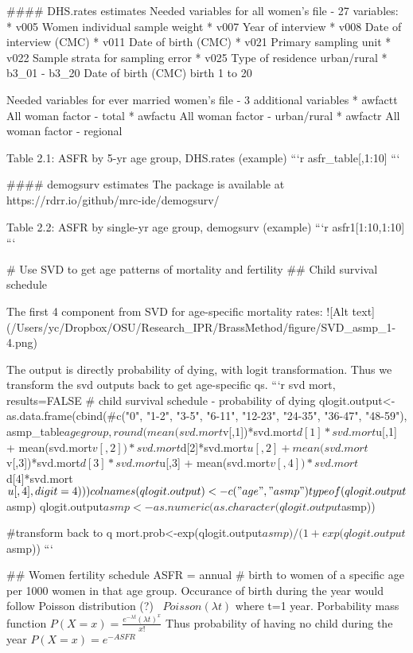 \documentclass[11pt,letterpaper]{article}
\begin{document}
#### DHS.rates estimates  
Needed variables for all women's file - 27 variables: 
* v005 Women individual sample weight
* v007 Year of interview
* v008 Date of interview (CMC)
* v011 Date of birth (CMC)
* v021 Primary sampling unit
* v022 Sample strata for sampling error
* v025 Type of residence urban/rural
* b3_01 - b3_20 Date of birth (CMC) birth 1 to 20

Needed variables for ever married women's file - 3 additional variables
* awfactt All woman factor - total
* awfactu All woman factor - urban/rural
* awfactr All woman factor - regional

Table 2.1: ASFR by 5-yr age group, DHS.rates (example)  
```{r}
asfr_table[,1:10]
```

#### demogsurv estimates  
The package is available at https://rdrr.io/github/mrc-ide/demogsurv/

Table 2.2: ASFR by single-yr age group, demogsurv (example)  
```{r}
asfr1[1:10,1:10]
```

# Use SVD to get age patterns of mortality and fertility  
## Child survival schedule

The first 4 component from SVD for age-specific mortality rates:  
![Alt text](/Users/yc/Dropbox/OSU/Research_IPR/BrassMethod/figure/SVD_asmp_1-4.png)

The output is directly probability of dying, with logit transformation. Thus we transform the svd outputs back to get age-specific qs.  
```{r svd mort, results=FALSE}
# child survival schedule - probability of dying
qlogit.output<-as.data.frame(cbind(#c("0", "1-2", "3-5", "6-11", "12-23", "24-35", "36-47", "48-59"), 
  asmp_table$agegroup,
  round(mean(svd.mort$v[,1])*svd.mort$d[1]*svd.mort$u[,1] + 
          mean(svd.mort$v[,2])*svd.mort$d[2]*svd.mort$u[,2] + 
          mean(svd.mort$v[,3])*svd.mort$d[3]*svd.mort$u[,3] + 
          mean(svd.mort$v[,4])*svd.mort$d[4]*svd.mort$u[,4], digit=4) ))
colnames(qlogit.output)<-c("age","asmp")
  typeof(qlogit.output$asmp) 
  qlogit.output$asmp<-as.numeric(as.character(qlogit.output$asmp))

#transform back to q
  mort.prob<-exp(qlogit.output$asmp)/(1+exp(qlogit.output$asmp))
```

## Women fertility schedule
ASFR = annual # birth to women of a specific age per 1000 women in that age group.  
Occurance of birth during the year would follow Poisson distribution (?) ~$Poisson(\lambda t)$ where t=1 year. Porbability mass function $P(X=x)=\frac{e^{-\lambda t}(\lambda t)^x}{x!}$  
Thus probability of having no child during the year $P(X=x)=e^{-ASFR}$  
\end{document}
